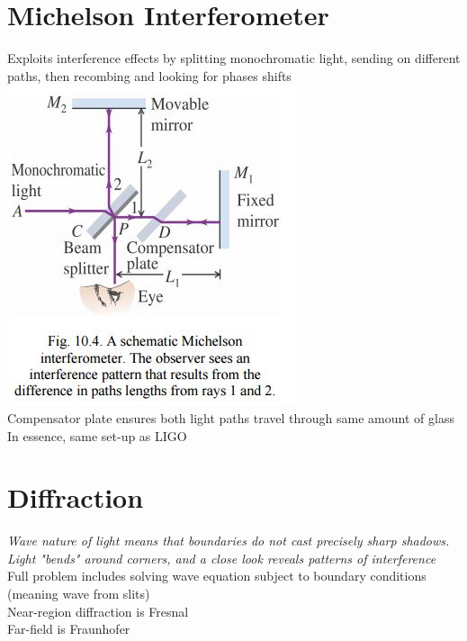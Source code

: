 \documentclass[a4paper, 11pt, fleqn, normalem]{report}
\begin{document}
\section{Michelson Interferometer}
Exploits interference effects by splitting monochromatic light, sending on different paths, then recombing and looking for phases shifts \\
\includegraphics[scale=0.8]{Michelson.jpg} \\
Compensator plate ensures both light paths travel through same amount of glass \\
In essence, same set-up as LIGO

\section{Diffraction}
\emph{Wave nature of light means that boundaries do not cast precisely sharp shadows. Light "bends" around corners, and a close look reveals patterns of interference} \\
Full problem includes solving wave equation subject to boundary conditions (meaning wave from slits) \\
Near-region diffraction is Fresnal \\
Far-field is Fraunhofer
\end{document}
